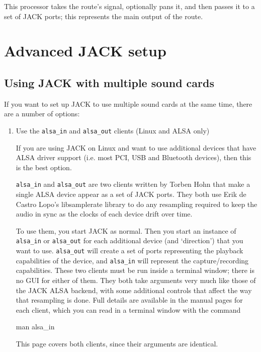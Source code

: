 \documentclass[10pt,a4paper]{book}
\begin{document}
{This processor takes the route's signal, optionally pans it, and then
passes it to a set of JACK ports; this represents the main output of
the route.


\appendix
\chapter{Advanced JACK setup}
\label{ap:advanced-jack}

\section{Using JACK with multiple sound cards}

If you want to set up JACK to use multiple sound cards at the same
time, there are a number of options:

\begin{enumerate}

\item Use the \texttt{alsa\_in} and \texttt{alsa\_out} clients (Linux and ALSA only)

If you are using JACK on Linux and want to use additional devices that
have ALSA driver support (i.e. most PCI, USB and Bluetooth devices),
then this is the best option.

\texttt{alsa\_in} and \texttt{alsa\_out} are two clients written by
Torben Hohn that make a single ALSA device appear as a set
of JACK ports. They both use Erik de Castro Lopo's libsamplerate
library to do any resampling required to keep the audio in sync as the
clocks of each device drift over time.

To use them, you start JACK as normal. Then you start an instance of
\texttt{alsa\_in} or \texttt{alsa\_out} for each additional device
(and `direction') that you want to use. \texttt{alsa\_out} will create
a set of ports representing the playback capabilities of the device,
and \texttt{alsa\_in} will represent the capture/recording
capabilities. These two clients must be run inside a terminal window; 
there is no GUI for either of them. They both take arguments very much
like those of the JACK ALSA backend, with some additional controls
that affect the way that resampling is done. Full details are
available in the manual pages for each client, which you can read in a
terminal window with the command

\begin{listing}
man alsa\_in
\end{listing}

This page covers both clients, since their arguments are identical.


\end{enumerate}}
\end{document}
